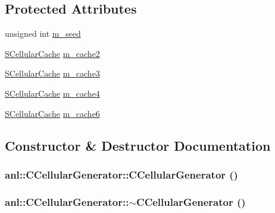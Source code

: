 \subsection*{Protected Attributes}
\begin{DoxyCompactItemize}
\item 
unsigned int \hyperlink{classanl_1_1CCellularGenerator_a547f19e49e06388d374a6dfb8b945b0b}{m\_\-seed}
\item 
\hyperlink{structanl_1_1SCellularCache}{SCellularCache} \hyperlink{classanl_1_1CCellularGenerator_a69ba0a99af66304244afa2aefd92c651}{m\_\-cache2}
\item 
\hyperlink{structanl_1_1SCellularCache}{SCellularCache} \hyperlink{classanl_1_1CCellularGenerator_a831039eccc549eb5e01688e4ee7cafee}{m\_\-cache3}
\item 
\hyperlink{structanl_1_1SCellularCache}{SCellularCache} \hyperlink{classanl_1_1CCellularGenerator_a85cd72144eed1321efc58fa5efc61a23}{m\_\-cache4}
\item 
\hyperlink{structanl_1_1SCellularCache}{SCellularCache} \hyperlink{classanl_1_1CCellularGenerator_a6dc91f70aa9ee7c8253b0b4e4faf3d75}{m\_\-cache6}
\end{DoxyCompactItemize}


\subsection{Constructor \& Destructor Documentation}
\hypertarget{classanl_1_1CCellularGenerator_a6adb5a1b663b11cc559959fe00380002}{
\subsubsection[{CCellularGenerator}]{\setlength{\rightskip}{0pt plus 5cm}anl::CCellularGenerator::CCellularGenerator ()}}
\label{classanl_1_1CCellularGenerator_a6adb5a1b663b11cc559959fe00380002}
\hypertarget{classanl_1_1CCellularGenerator_ac9484d5afd8478843dab92f45a08f80e}{
\subsubsection[{$\sim$CCellularGenerator}]{\setlength{\rightskip}{0pt plus 5cm}anl::CCellularGenerator::$\sim$CCellularGenerator ()}}
\label{classanl_1_1CCellularGenerator_ac9484d5afd8478843dab92f45a08f80e}


